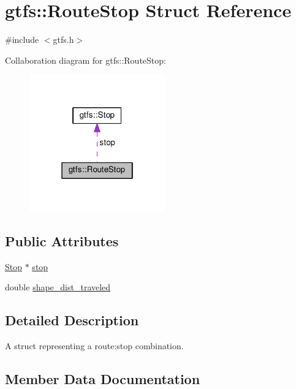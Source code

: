 \hypertarget{structgtfs_1_1RouteStop}{}\section{gtfs\+:\+:Route\+Stop Struct Reference}
\label{structgtfs_1_1RouteStop}


{\ttfamily \#include $<$gtfs.\+h$>$}



Collaboration diagram for gtfs\+:\+:Route\+Stop\+:
\nopagebreak
\begin{figure}[H]
\begin{center}
\leavevmode
\includegraphics[width=166pt]{structgtfs_1_1RouteStop__coll__graph}
\end{center}
\end{figure}
\subsection*{Public Attributes}
\begin{DoxyCompactItemize}
\item 
\hyperlink{classgtfs_1_1Stop}{Stop} $\ast$ \hyperlink{structgtfs_1_1RouteStop_ae14c110356572344748f08c07fea1b0c}{stop}
\item 
double \hyperlink{structgtfs_1_1RouteStop_ab738c008a00eab17953ab124a86ca207}{shape\+\_\+dist\+\_\+traveled}
\end{DoxyCompactItemize}


\subsection{Detailed Description}
A struct representing a route\+:stop combination. 

\subsection{Member Data Documentation}
\mbox{\label{structgtfs_1_1RouteStop_ab738c008a00eab17953ab124a86ca207}} 
